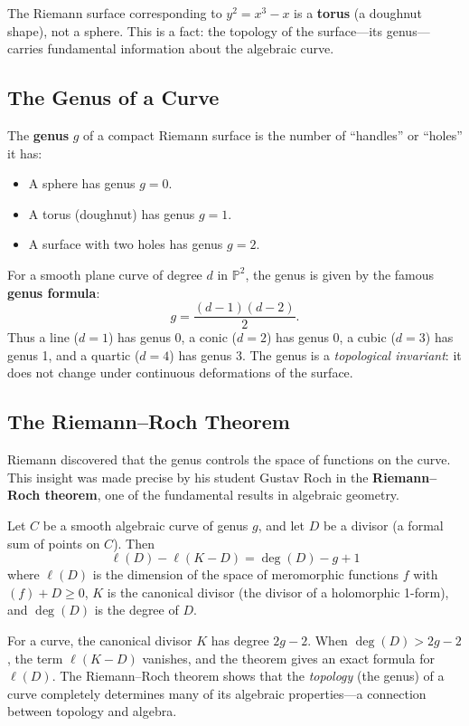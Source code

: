 The Riemann surface corresponding to $y^2 = x^3 - x$ is a \textbf{torus} (a doughnut shape), not a sphere. This is a fact: the topology of the surface---its genus---carries fundamental information about the algebraic curve.

\subsection{The Genus of a Curve}

The \textbf{genus} $g$ of a compact Riemann surface is the number of ``handles'' or ``holes'' it has:
\begin{itemize}
    \item A sphere has genus $g = 0$.
    \item A torus (doughnut) has genus $g = 1$.
    \item A surface with two holes has genus $g = 2$.
\end{itemize}

For a smooth plane curve of degree $d$ in $\mathbb{P}^2$, the genus is given by the famous \textbf{genus formula}:
\[
    g = \frac{(d-1)(d-2)}{2}.
\]
Thus a line ($d=1$) has genus 0, a conic ($d=2$) has genus 0, a cubic ($d=3$) has genus 1, and a quartic ($d=4$) has genus 3. The genus is a \emph{topological invariant}: it does not change under continuous deformations of the surface.

\subsection{The Riemann--Roch Theorem}

Riemann discovered that the genus controls the space of functions on the curve. This insight was made precise by his student Gustav Roch in the \textbf{Riemann--Roch theorem}, one of the fundamental results in algebraic geometry.

\begin{theorem}\label{thm:riemann-roch}
Let $C$ be a smooth algebraic curve of genus $g$, and let $D$ be a divisor (a formal sum of points on $C$). Then
\[
    \ell(D) - \ell(K - D) = \deg(D) - g + 1
\]
where $\ell(D)$ is the dimension of the space of meromorphic functions $f$ with $(f) + D \geq 0$, $K$ is the canonical divisor (the divisor of a holomorphic 1-form), and $\deg(D)$ is the degree of $D$.
\end{theorem}

For a curve, the canonical divisor $K$ has degree $2g - 2$. When $\deg(D) > 2g - 2$, the term $\ell(K - D)$ vanishes, and the theorem gives an exact formula for $\ell(D)$. The Riemann--Roch theorem shows that the \emph{topology} (the genus) of a curve completely determines many of its algebraic properties---a connection between topology and algebra.

